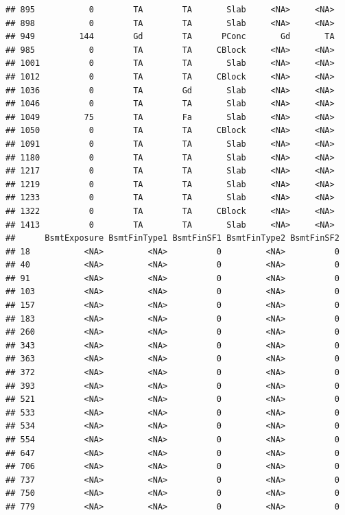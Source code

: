 \documentclass[]{article}
\begin{document}
\begin{verbatim}
## 895           0        TA        TA       Slab     <NA>     <NA>
## 898           0        TA        TA       Slab     <NA>     <NA>
## 949         144        Gd        TA      PConc       Gd       TA
## 985           0        TA        TA     CBlock     <NA>     <NA>
## 1001          0        TA        TA       Slab     <NA>     <NA>
## 1012          0        TA        TA     CBlock     <NA>     <NA>
## 1036          0        TA        Gd       Slab     <NA>     <NA>
## 1046          0        TA        TA       Slab     <NA>     <NA>
## 1049         75        TA        Fa       Slab     <NA>     <NA>
## 1050          0        TA        TA     CBlock     <NA>     <NA>
## 1091          0        TA        TA       Slab     <NA>     <NA>
## 1180          0        TA        TA       Slab     <NA>     <NA>
## 1217          0        TA        TA       Slab     <NA>     <NA>
## 1219          0        TA        TA       Slab     <NA>     <NA>
## 1233          0        TA        TA       Slab     <NA>     <NA>
## 1322          0        TA        TA     CBlock     <NA>     <NA>
## 1413          0        TA        TA       Slab     <NA>     <NA>
##      BsmtExposure BsmtFinType1 BsmtFinSF1 BsmtFinType2 BsmtFinSF2
## 18           <NA>         <NA>          0         <NA>          0
## 40           <NA>         <NA>          0         <NA>          0
## 91           <NA>         <NA>          0         <NA>          0
## 103          <NA>         <NA>          0         <NA>          0
## 157          <NA>         <NA>          0         <NA>          0
## 183          <NA>         <NA>          0         <NA>          0
## 260          <NA>         <NA>          0         <NA>          0
## 343          <NA>         <NA>          0         <NA>          0
## 363          <NA>         <NA>          0         <NA>          0
## 372          <NA>         <NA>          0         <NA>          0
## 393          <NA>         <NA>          0         <NA>          0
## 521          <NA>         <NA>          0         <NA>          0
## 533          <NA>         <NA>          0         <NA>          0
## 534          <NA>         <NA>          0         <NA>          0
## 554          <NA>         <NA>          0         <NA>          0
## 647          <NA>         <NA>          0         <NA>          0
## 706          <NA>         <NA>          0         <NA>          0
## 737          <NA>         <NA>          0         <NA>          0
## 750          <NA>         <NA>          0         <NA>          0
## 779          <NA>         <NA>          0         <NA>          0

\end{verbatim}
\end{document}
